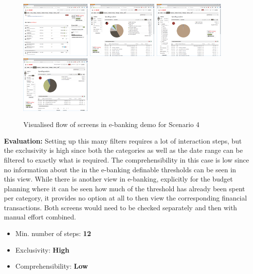 \begin{figure}[h]
	\begin{center}
		\includegraphics[width=3.5cm]{03_Figures/09_Evaluation/UBS_1_Overview.png}
		\includegraphics[width=3.5cm]{03_Figures/09_Evaluation/UBS_2_SpendingAnalysis.png}
		\includegraphics[width=3.5cm]{03_Figures/09_Evaluation/UBS_2_SpendingAnalysis_FilterCat.png}
		\includegraphics[width=3.5cm]{03_Figures/09_Evaluation/UBS_2_SpendingAnalysis_Filter.png}
		\caption{Visualised flow of screens in e-banking demo for Scenario 4}
		\label{fig:scenariofourebanking}
	\end{center}
\end{figure}

\textbf{Evaluation:} Setting up this many filters requires a lot of interaction steps, but the exclusivity is high since both the categories as well as the date range can be filtered to exactly what is required. The comprehensibility in this case is low since no information about the in the e-banking definable thresholds can be seen in this view. While there is another view in e-banking, explicitly for the budget planning where it can be seen how much of the threshold has already been spent per category, it provides no option at all to then view the corresponding financial transactions. Both screens would need to be checked separately and then with manual effort combined.
\begin{itemize}[noitemsep,nolistsep]
	\item Min. number of steps: \textbf{12}
	\item Exclusivity: \textbf{High}
	\item Comprehensibility: \textbf{Low}
\end{itemize}


